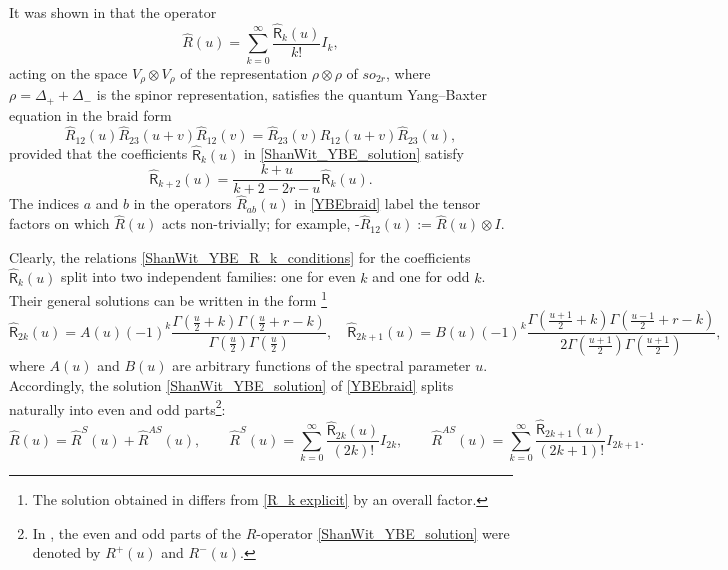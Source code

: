 \documentclass[a4paper]{article}
\newcommand{\hR}{\hat{R}}
\newcommand{\hsR}{\hat{\mathsf{R}}}
\renewcommand{\=}{\ =\ }
\numberwithin{equation}{section}
\theoremstyle{remark}
\begin{document}
It was shown in \cite{ShanWit,ChDerIs,IsKarKir2} that the operator
\begin{equation}\label{ShanWit_YBE_solution}
\hat{R}(u)=\sum_{k=0}^{\infty}\frac{\hsR_k(u)}{k!}I_k,
\end{equation}
acting on the space $V_\rho\otimes V_\rho$ of the representation $\rho\otimes \rho$ of $so_{2r}$, where $\rho=\Delta_++\Delta_-$ is the spinor representation, satisfies the quantum Yang--Baxter equation in the braid form
\begin{equation}\label{YBEbraid}
\hR_{12}(u)\hR_{23}(u+v)\hR_{12}(v)=\hR_{23}(v)\hR_{12}(u+v)\hR_{23}(u),
\end{equation}
provided that the coefficients $\hsR_k(u)$ in \eqref{ShanWit_YBE_solution} satisfy
\begin{equation}\label{ShanWit_YBE_R_k_conditions}
\hsR_{k+2}(u)=\frac{k+u}{k+2-2r-u}\hsR_k(u).
\end{equation}
The indices $a$ and $b$ in the operators $\hR_{ab}(u)$ in \eqref{YBEbraid} label the tensor factors on which $\hR(u)$ acts non-trivially; for example, -$\hR_{12}(u):=\hR(u)\otimes I$.

Clearly, the relations \eqref{ShanWit_YBE_R_k_conditions} for the coefficients $\hsR_k(u)$ split into two independent families: one for even $k$ and one for odd $k$. Their general solutions can be written in the form \cite{ShanWit,ChDerIs,IsKarKir2}\footnote{The solution obtained in \cite{IsKarKir2} differs from \eqref{R_k explicit} by an overall factor.}
\begin{equation}\label{R_k explicit}
\hsR_{2k}(u)=A(u)(-1)^k\frac{\Gamma(\frac{u}{2}+k)\Gamma(\frac{u}{2}+r-k)}{\Gamma(\frac{u}{2})\Gamma(\frac{u}{2})},\quad
\hsR_{2k+1}(u)=B(u)(-1)^k\frac{\Gamma(\frac{u+1}{2}+k)\Gamma(\frac{u-1}{2}+r-k)}{2\Gamma(\frac{u+1}{2})\Gamma(\frac{u+1}{2})},
\end{equation}
where $A(u)$ and $B(u)$ are arbitrary functions of the spectral parameter $u$. Accordingly, the solution \eqref{ShanWit_YBE_solution} of \eqref{YBEbraid} splits naturally into even and odd parts\footnote{In \cite{ChDerIs}, the even and odd parts of the $R$-operator \eqref{ShanWit_YBE_solution} were denoted by $R^+(u)$ and $R^-(u)$.}:
\begin{equation}\label{ShanWit_sym+antisym}
\hR(u)=\hR^S(u)+\hR^{AS}(u),
\qquad
\hR^S(u)=\sum_{k=0}^\infty \frac{\hsR_{2k}(u)}{(2k)!}I_{2k},
\qquad
\hR^{AS}(u)=\sum_{k=0}^\infty \frac{\hsR_{2k+1}(u)}{(2k+1)!}I_{2k+1}.
\end{equation}
\end{document}
